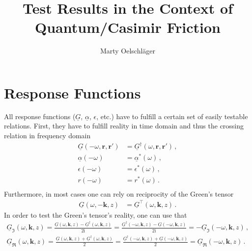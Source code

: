 \documentclass[11pt]{article}
\title{Test Results in the Context of Quantum/Casimir Friction}
\author{Marty Oelschläger}
\newcommand{\vv}[1]{\mathbf{#1}}
\newcommand{\ii}[0]{\mathrm{i}}
\begin{document}
\maketitle
\section{Response Functions}
All response functions ($\underline{G}$, $\underline{\alpha}$, $\epsilon$, etc.) have to fulfill a certain set of easily testable relations. First, they have to fulfill reality in time domain and thus the crossing relation in frequency domain
\begin{align}
\underline{G}(-\omega,\vv r, \vv r') &= \underline{G}^\dagger(\omega,\vv r, \vv r')\,,  \\
\underline{\alpha}(-\omega) &= \underline{\alpha}^*(\omega) \,,\\
\epsilon(-\omega) &= \epsilon^*(\omega)  \,,\\
r(-\omega) &= r^*(\omega)  \,.\\
\end{align}
Furthermore, in most cases one can rely on reciprocity of the Green's tensor
\begin{align}
\underline{G}(\omega,-\vv k,z) &= \underline{G}^\intercal(\omega,\vv k, z)\,.
\end{align}
In order to test the Green's tensor's reality, one can use that
\begin{align}
\underline{G}_\Im(\omega,\vv k, z) =\frac{\underline{G}(\omega,\vv k, z) - \underline{G}^\dagger(\omega,\vv k, z)}{2\ii}=
\frac{\underline{G}^\dagger(-\omega,\vv k, z) - \underline{G}(-\omega,\vv k, z)}{2\ii}= -\underline{G}_\Im(-\omega,\vv k, z)\,,\\
\underline{G}_\Re(\omega,\vv k, z) =\frac{\underline{G}(\omega,\vv k, z) + \underline{G}^\dagger(\omega,\vv k, z)}{2}=
\frac{\underline{G}^\dagger(-\omega,\vv k, z) + \underline{G}(-\omega,\vv k, z)}{2}= \underline{G}_\Re(-\omega,\vv k, z)
\,.
\end{align}
\end{document}
